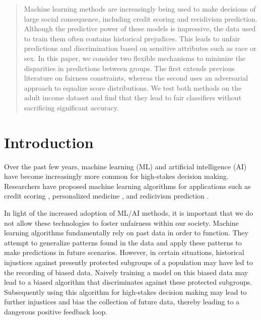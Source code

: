 \documentclass{article}
\begin{document}
\begin{abstract}
	Machine learning methods are increasingly being used to make decisions of large social consequence, including credit scoring and recidivism prediction. Although the predictive power of these models is impressive, the data used to train them often contains historical prejudices. This leads to unfair predictions and discrimination based on sensitive attributes such as race or sex. In this paper, we consider two flexible mechanisms to minimize the disparities in predictions between groups. The first extends previous literature on fairness constraints, whereas the second uses an adversarial approach to equalize score distributions. We test both methods on the adult income dataset and find that they lead to fair classifiers without sacrificing significant accuracy.
\end{abstract}

\section{Introduction}
\label{submission}

Over the past few years, machine learning (ML) and artificial intelligence (AI) have become increasingly more common for high-stakes decision making.  Researchers have proposed machine learning algorithms for applications such as credit scoring \citep{huang2007credit}, personalized medicine \citep{poplin2018prediction}, and redicivism prediction \citep{tollenaar2013method}.  

In light of the increased adoption of ML/AI methods, it is important that we do not allow these technologies to foster unfairness within our society.  Machine learning algorithms fundamentally rely on past data in order to function. They attempt to generalize patterns found in the data and apply these patterns to make predictions in future scenarios.  However, in certain situations, historical injustices against presently protected subgroups of a population may have led to the recording of biased data.  Naively training a model on this biased data may lead to a biased algorithm that discriminates against these protected subgroups.  Subsequently using this algorithm for high-stakes decision making may lead to further injustices and bias the collection of future data, thereby leading to a dangerous positive feedback loop.  
\end{document}
